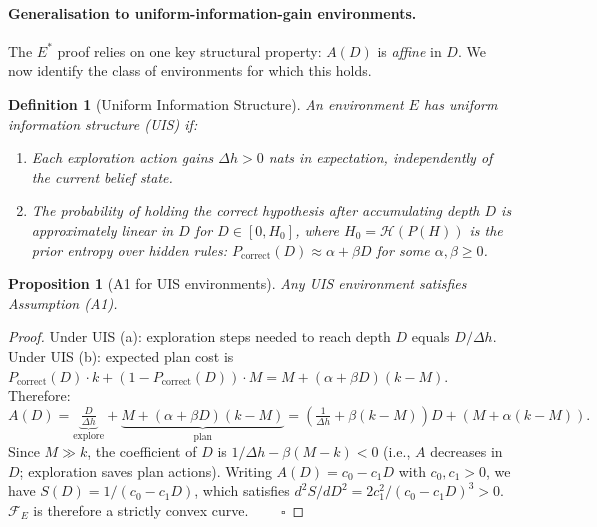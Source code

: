 \documentclass[11pt]{article}
\newtheorem{proposition}{Proposition}
\newtheorem{definition}{Definition}
\begin{document}
\paragraph{Generalisation to uniform-information-gain environments.} The $E^*$ proof relies on one key structural property: $A(D)$ is \emph{affine} in $D$. We now identify the class of environments for which this holds.

\begin{definition}[Uniform Information Structure]
An environment $E$ has \emph{uniform information structure} (UIS) if:
\begin{enumerate}[label=(\alph*)]
\item Each exploration action gains $\Delta h > 0$ nats in expectation, independently of the current belief state.
\item The probability of holding the correct hypothesis after accumulating depth $D$ is approximately linear in $D$ for $D \in [0, H_0]$, where $H_0 = \mathcal{H}(P(H))$ is the prior entropy over hidden rules: $P_{\mathrm{correct}}(D) \approx \alpha + \beta D$ for some $\alpha, \beta \geq 0$.
\end{enumerate}
\end{definition}

\begin{proposition}[A1 for UIS environments]
\label{prop:uis}
Any UIS environment satisfies Assumption (A1).
\end{proposition}

\begin{proof}
Under UIS (a): exploration steps needed to reach depth $D$ equals $D / \Delta h$. Under UIS (b): expected plan cost is $P_{\mathrm{correct}}(D) \cdot k + (1 - P_{\mathrm{correct}}(D)) \cdot M = M + (\alpha + \beta D)(k - M)$. Therefore:
\begin{equation}
A(D) = \underbrace{\tfrac{D}{\Delta h}}_{\text{explore}} + \underbrace{M + (\alpha + \beta D)(k-M)}_{\text{plan}} = \left(\tfrac{1}{\Delta h} + \beta(k-M)\right)D + \left(M + \alpha(k-M)\right).
\end{equation}
Since $M \gg k$, the coefficient of $D$ is $1/\Delta h - \beta(M-k) < 0$ (i.e., $A$ decreases in $D$; exploration saves plan actions). Writing $A(D) = c_0 - c_1 D$ with $c_0, c_1 > 0$, we have $S(D) = 1/(c_0 - c_1 D)$, which satisfies $d^2S/dD^2 = 2c_1^2/(c_0-c_1 D)^3 > 0$. $\mathcal{F}_E$ is therefore a strictly convex curve. $\qquad\square$
\end{proof}
\end{document}
